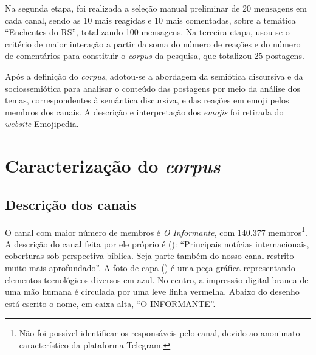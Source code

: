 \documentclass[portuguese]{textolivre}
\begin{document}
Na segunda etapa, foi realizada a seleção manual preliminar de 20 mensagens em cada canal, sendo as 10 mais reagidas e 10 mais comentadas, sobre a temática ``Enchentes do RS'', totalizando 100 mensagens. Na terceira etapa, usou-se o critério de maior interação a partir da soma do número de reações e do número de comentários para constituir o \textit{corpus} da pesquisa, que totalizou 25 postagens.

Após a definição do \textit{corpus}, adotou-se a abordagem da semiótica discursiva e da sociossemiótica para analisar o conteúdo das postagens por meio da análise dos temas, correspondentes à semântica discursiva, e das reações em emoji pelos membros dos canais. A descrição e interpretação dos \textit{emojis} foi retirada do \textit{website} Emojipedia.


\section{Caracterização do \textit{corpus}}\label{sec-carac_corpus}

\subsection{Descrição dos canais}
O canal com maior número de membros é \emph{O Informante}, com 140.377 membros\footnote{Não foi possível identificar os responsáveis pelo canal, devido ao anonimato característico da plataforma Telegram.}. A descrição do canal feita por ele próprio é (): ``Principais notícias internacionais, coberturas sob perspectiva bíblica. Seja parte também do nosso canal restrito muito mais aprofundado''. A foto de capa () é uma peça gráfica representando elementos tecnológicos diversos em azul. No centro, a impressão digital branca de uma mão humana é circulada por uma leve linha vermelha. Abaixo do desenho está escrito o nome, em caixa alta, ``O INFORMANTE''.
\end{document}
